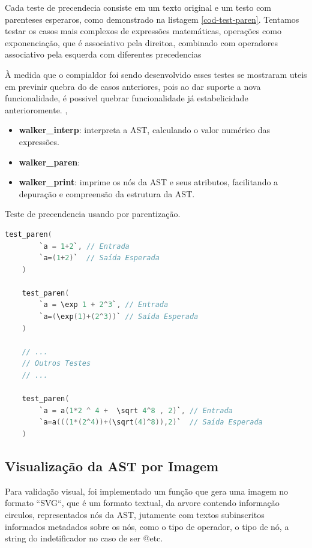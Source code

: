 Cada teste de precendecia consiste em um texto original e um testo com parenteses esperaros, como demonstrado na listagem \autoref{cod-test-paren}. Tentamos testar os casos mais complexos de expressões matemáticas, operações como exponenciação, que é associativo pela direitoa, combinado com operadores associativo pela esquerda  com diferentes precedencias

À medida que o compialdor foi sendo desenvolvido esses testes se mostraram uteis em previnir quebra do de casos anteriores, pois ao dar suporte a nova funcionalidade, é possivel quebrar funcionalidade já estabelicidade anterioromente.
,\begin{itemize}
  \item \textbf{walker\_interp}: interpreta a AST, calculando o valor numérico das expressões.
  \item \textbf{walker\_paren}:   \item \textbf{walker\_print}: imprime os nós da AST e seus atributos, facilitando a depuração e compreensão da estrutura da AST.

\end{itemize}
\begin{codigo}[htb]
    \caption{\small Teste de precendencia usando por parentização. }
        \label{cod-test-paren}
  \begin{lstlisting}[language = C]
    test_paren(
        `a = 1+2`, // Entrada
        `a=(1+2)`  // Saída Esperada
    )

    test_paren(
        `a = \exp 1 + 2^3`, // Entrada
        `a=(\exp(1)+(2^3))` // Saída Esperada
    )

    // ...
    // Outros Testes
    // ...

    test_paren(
        `a = a(1*2 ^ 4 +  \sqrt 4^8 , 2)`, // Entrada
        `a=a(((1*(2^4))+(\sqrt(4)^8)),2)`  // Saída Esperada
    )
  \end{lstlisting}
\end{codigo}



\subsection{Visualização da AST por Imagem}

Para validação visual, foi implementado um função que gera uma imagem no formato ``SVG``, que é um formato textual, da arvore contendo informação circulos, representados nós da AST, jutamente com textos subinscritos informados metadados sobre os nós, como o tipo de operador, o tipo de nó, a string do indetificador  no caso de ser @etc.

